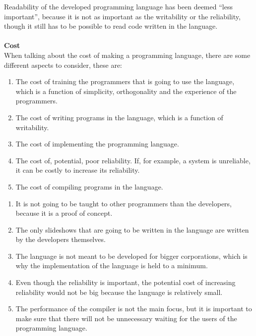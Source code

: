 Readability of the developed programming language has been deemed ``less important'', because it is not as important as the writability or the reliability, though it still has to be possible to read code written in the language.
\\ \\
\textbf{Cost} \\
When talking about the cost of making a programming language, there are some different aspects to consider, these are:
\begin{enumerate}
	\item The cost of training the programmers that is going to use the language, which is a function of simplicity, orthogonality and the experience of the programmers.
	\item The cost of writing programs in the language, which is a function of writability.
	\item The cost of implementing the programming language.
	\item The cost of, potential, poor reliability. If, for example, a system is unreliable, it can be costly to increase its reliability.
	\item The cost of compiling programs in the language.
\end{enumerate}

\begin{enumerate}
	\item It is not going to be taught to other programmers than the developers, because it is a proof of concept.
	\item The only slideshows that are going to be written in the language are written by the developers themselves.
 \item The language is not meant to be developed for bigger corporations, which is why the implementation of the language is held to a minimum.
	\item Even though the reliability is important, the potential cost of increasing reliability would not be big because the language is relatively small.
	\item The performance of the compiler is not the main focus, but it is important to make sure that there will not be unnecessary waiting for the users of the programming language.
\end{enumerate}

